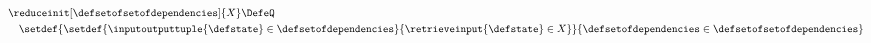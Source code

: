 \begin{align*}
  &\reduceinit[\defsetofsetofdependencies]{X} \DefeQ \\
  &\quad \setdef{
    \setdef{
      \inputoutputtuple{\defstate}\in\defsetofdependencies
    }{
      \retrieveinput{\defstate} \in X
    }
  }{
    \defsetofdependencies\in \defsetofsetofdependencies
  }
  \end{align*}
